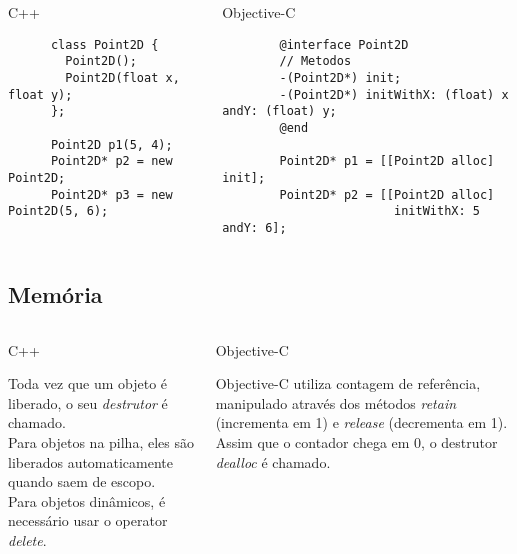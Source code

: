 \documentclass[brazil]{beamer}
\begin{document}
\begin{frame}[fragile]
  \begin{columns}
    \begin{column}{.35\textwidth}
      \begin{center}
        C++
      \end{center}
      \lstset{language=C++,basicstyle=\tiny}
      \begin{lstlisting}
      class Point2D {
        Point2D();
        Point2D(float x, float y);
      };
      
      Point2D p1(5, 4);
      Point2D* p2 = new Point2D;
      Point2D* p3 = new Point2D(5, 6);
      \end{lstlisting}
    \end{column}
    \begin{column}{.65\textwidth}
      \begin{center}
        Objective-C
      \end{center}
      \lstset{language=C++,basicstyle=\tiny}
      \begin{lstlisting}
        @interface Point2D
        // Metodos
        -(Point2D*) init;
        -(Point2D*) initWithX: (float) x andY: (float) y;
        @end
        
        Point2D* p1 = [[Point2D alloc] init];
        Point2D* p2 = [[Point2D alloc] 
                        initWithX: 5 andY: 6];
      \end{lstlisting}
    \end{column}
  \end{columns}
\end{frame}

\subsection{Memória}
\begin{frame}
  \begin{columns}
    \begin{column}{.55\textwidth}
        \begin{center}
            C++
        \end{center}
        Toda vez que um objeto é liberado, o seu \textit{destrutor} é chamado. \\
        Para objetos na pilha, eles são liberados automaticamente quando saem de escopo. \\
        Para objetos dinâmicos, é necessário usar o operator \textit{delete}.
    \end{column}
    \begin{column}{.55\textwidth}
        \begin{center}
            Objective-C
        \end{center}

        Objective-C utiliza contagem de referência, manipulado através dos métodos \textit{retain} 
        (incrementa em 1) e \textit{release} (decrementa em 1). \\
        Assim que o contador chega em 0, o destrutor \textit{dealloc} é chamado.
    \end{column}
  \end{columns}
\end{frame}
\end{document}
